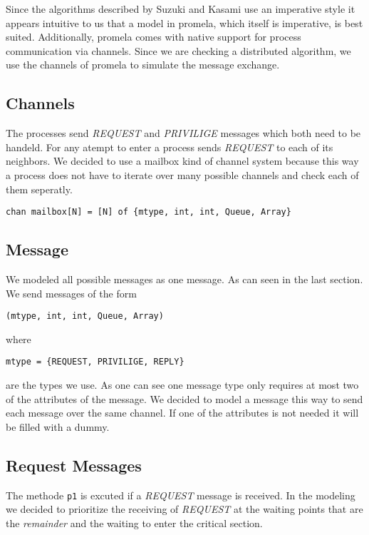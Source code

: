 \documentclass{llncs}
\begin{document}
Since the algorithms described by Suzuki and Kasami use an imperative style it appears intuitive to us
that a model in promela, which itself is imperative, is best suited. Additionally, promela comes with
native support for process communication via channels. Since we are checking a distributed algorithm,
we use the channels of promela to simulate the message exchange.

\subsection{Channels}

The processes send \emph{REQUEST} and \emph{PRIVILIGE} messages which both
need to be handeld. For any atempt to enter a process sends \emph{REQUEST} to
each of its neighbors. We decided to use a mailbox kind of channel system because
this way a process does not have to iterate over many possible channels and check
each of them seperatly.

\begin{lstlisting}
chan mailbox[N] = [N] of {mtype, int, int, Queue, Array}
\end{lstlisting}

\subsection{Message}

We modeled all possible messages as one message. As can seen in
the last section. We send messages of the form
\begin{lstlisting}
(mtype, int, int, Queue, Array)
\end{lstlisting}
where
\begin{lstlisting}
mtype = {REQUEST, PRIVILIGE, REPLY}
\end{lstlisting}
are the types we use. As one can see one message type only requires
at most two of the attributes of the message. We decided to model a
message this way to send each message over the same channel. If one of
the attributes is not needed it will be filled with a dummy.


\subsection{Request Messages}

The methode \lstinline|p1| is excuted if a \emph{REQUEST} message is received.
In the modeling we decided to prioritize the receiving of \emph{REQUEST} at the
waiting points that are the \emph{remainder} and the waiting to enter the critical section.
\end{document}
